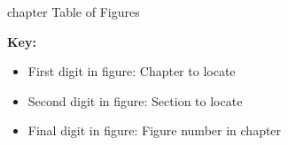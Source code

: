 \cleardoublepage
{}
{}
    {chapter}
    {Table of Figures}
\renewcommand{\listfigurename}
    {Table of Figures}

\renewcommand{\cftloftitlefont}
    {\normalfont\sffamily\huge\bfseries}
\listoffigures

\textbf{Key:}
\begin{itemize}
    \item First digit in figure: Chapter to locate
    \item Second digit in figure: Section to locate
    \item Final digit in figure: Figure number in chapter
\end{itemize}
